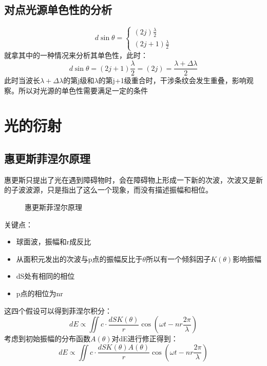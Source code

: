 \documentclass[UFT8]{article}
\begin{document}
\subsection{对点光源单色性的分析}
\begin{equation*}
d\sin \theta=
\begin{cases}
(2j)\frac{\lambda}{2}\\
(2j+1)\frac{\lambda}{2}
\end{cases}
\end{equation*}
就拿其中的一种情况来分析其单色性，此时：
\[
	d\sin\theta=(2j+1)\frac{\lambda}{2}=(2j)=\frac{\lambda+\Delta\lambda}{2}
\]
此时当波长$\lambda+\Delta\lambda$的第j级和$\lambda$的第j+1级重合时，干涉条纹会发生重叠，影响观察。所以对光源的单色性需要满足一定的条件
\section{光的衍射}
\subsection{惠更斯菲涅尔原理}
惠更斯只提出了光在遇到障碍物时，会在障碍物上形成一下新的次波，次波又是新的子波波源，只是指出了这么一个现象，而没有描述振幅和相位。
\begin{figure}[htbp]
\begin{center}
\end{center}
\caption{惠更斯菲涅尔原理}
\end{figure}
关键点：
\begin{itemize}
\item 球面波，振幅和r成反比
\item 从面积元发出的次波与p点的振幅反比于$\theta$所以有一个倾斜因子$K(\theta)$影响振幅
\item dS处有相同的相位
\item p点的相位为nr
\end{itemize}
这四个假设可以得到菲涅尔积分：
\[
	dE\propto\iint c\cdot \frac{dS K(\theta)}{r}\cos (\omega t-nr\frac{2\pi }{\lambda})
\]
考虑到初始振幅的分布函数$A(\theta)$对dE进行修正得到：
\[
	dE\propto\iint c\cdot \frac{dS K(\theta)A(\theta)}{r}\cos (\omega t-nr\frac{2\pi }{\lambda})
\]
\end{document}
